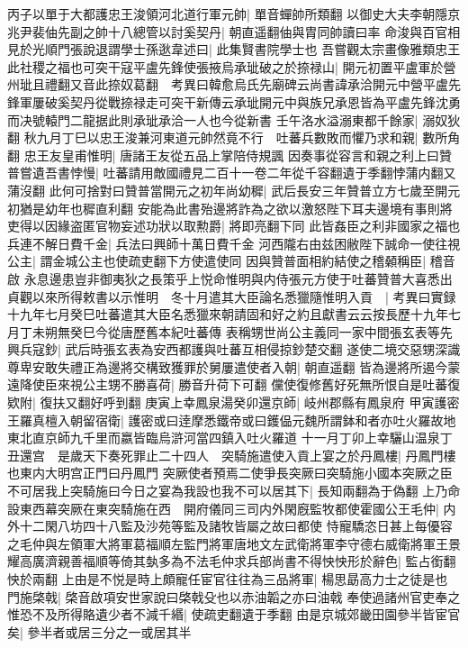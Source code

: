 丙子以單于大都護忠王浚領河北道行軍元帥|{
	單音蟬帥所類翻}
以御史大夫李朝隱京兆尹裴伷先副之帥十八總管以討奚契丹|{
	朝直遥翻伷與胄同帥讀曰率}
命浚與百官相見於光順門張說退謂學士孫逖韋述曰|{
	此集賢書院學士也}
吾嘗觀太宗畫像雅類忠王此社稷之福也可突干寇平盧先鋒使張掖烏承玼破之於捺禄山|{
	開元初置平盧軍於營州玼且禮翻又音此捺奴葛翻　考異曰韓愈烏氏先廟碑云尚書諱承洽開元中營平盧先鋒軍屢破奚契丹從戰捺禄走可突干新傳云承玼開元中與族兄承恩皆為平盧先鋒沈勇而决號轅門二龍据此則承玼承洽一人也今從新書}
壬午洛水溢溺東都千餘家|{
	溺奴狄翻}
秋九月丁巳以忠王浚兼河東道元帥然竟不行　吐蕃兵數敗而懼乃求和親|{
	數所角翻}
忠王友皇甫惟明|{
	唐諸王友從五品上掌陪侍規諷}
因奏事從容言和親之利上曰贊普嘗遺吾書悖慢|{
	吐蕃請用敵國禮見二百十一卷二年從千容翻遺于季翻悖蒲内翻又蒲沒翻}
此何可捨對曰贊普當開元之初年尚幼穉|{
	武后長安三年贊普立方七歲至開元初猶是幼年也穉直利翻}
安能為此書殆邊將詐為之欲以激怒陛下耳夫邊境有事則將吏得以因緣盗匿官物妄述功狀以取勲爵|{
	將即亮翻下同}
此皆姦臣之利非國家之福也兵連不解日費千金|{
	兵法曰興師十萬日費千金}
河西隴右由兹困敝陛下誠命一使往視公主|{
	謂金城公主也使疏吏翻下方使遣使同}
因與贊普面相約結使之稽顙稱臣|{
	稽音啟}
永息邊患豈非御夷狄之長策乎上悦命惟明與内侍張元方使于吐蕃贊普大喜悉出貞觀以來所得敕書以示惟明　冬十月遣其大臣論名悉獵隨惟明入貢　|{
	考異曰實録十九年七月癸巳吐蕃遣其大臣名悉獵來朝請固和好之約且獻書云云按長歷十九年七月丁未朔無癸巳今從唐歷舊本紀吐蕃傳}
表稱甥世尚公主義同一家中間張玄表等先興兵寇鈔|{
	武后時張玄表為安西都護與吐蕃互相侵掠鈔楚交翻}
遂使二境交惡甥深識尊卑安敢失禮正為邊將交構致獲罪於舅屢遣使者入朝|{
	朝直遥翻}
皆為邊將所遏今蒙遠降使臣來視公主甥不勝喜荷|{
	勝音升荷下可翻}
儻使復修舊好死無所恨自是吐蕃復欵附|{
	復扶又翻好呼到翻}
庚寅上幸鳳泉湯癸卯還京師|{
	岐州郡縣有鳳泉府}
甲寅護密王羅真檀入朝留宿衛|{
	護密或曰逹摩悉鐵帝或曰鑊偘元魏所謂鉢和者亦吐火羅故地東北直京師九千里而嬴皆臨烏滸河當四鎮入吐火羅道}
十一月丁卯上幸驪山温泉丁丑還宫　是歲天下奏死罪止二十四人　突騎施遣使入貢上宴之於丹鳳樓|{
	丹鳳門樓也東内大明宫正門曰丹鳳門}
突厥使者預焉二使爭長突厥曰突騎施小國本突厥之臣不可居我上突騎施曰今日之宴為我設也我不可以居其下|{
	長知兩翻為于偽翻}
上乃命設東西幕突厥在東突騎施在西　開府儀同三司内外閑廐監牧都使霍國公王毛仲|{
	内外十二閑八坊四十八監及沙苑等監及諸牧皆屬之故曰都使}
恃寵驕恣日甚上每優容之毛仲與左領軍大將軍葛福順左監門將軍唐地文左武衛將軍李守德右威衛將軍王景耀高廣濟親善福順等倚其埶多為不法毛仲求兵部尚書不得怏怏形於辭色|{
	監占銜翻怏於兩翻}
上由是不悦是時上頗寵任宦官往往為三品將軍|{
	楊思勗高力士之徒是也}
門施棨戟|{
	棨音啟項安世家說曰棨戟殳也以赤油韜之亦曰油戟}
奉使過諸州官吏奉之惟恐不及所得賂遺少者不減千緡|{
	使疏吏翻遺于季翻}
由是京城郊畿田園參半皆宦官矣|{
	參半者或居三分之一或居其半}
